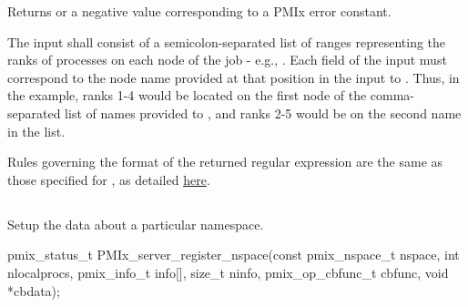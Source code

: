 Returns  or a negative value corresponding to a PMIx error constant.

\descr

The input shall consist of a semicolon-separated list of ranges representing the ranks of processes on each node of the job - e.g., . Each field of the input must correspond to the node name provided at that position in the input to . Thus, in the example, ranks 1-4 would be located on the first node of the comma-separated list of names provided to , and ranks 2-5 would be on the second name in the list.

Rules governing the format of the returned regular expression are the same as those specified for , as detailed \hyperref[regex:fmt]{here}.

\subsection{}

\summary

Setup the data about a particular namespace.

\format

\cspecificstart
\begin{codepar}
pmix_status_t
PMIx_server_register_nspace(const pmix_nspace_t nspace,
                            int nlocalprocs,
                            pmix_info_t info[], size_t ninfo,
                            pmix_op_cbfunc_t cbfunc,
                            void *cbdata);
\end{codepar}
\cspecificend

\begin{arglist}
\end{arglist}

